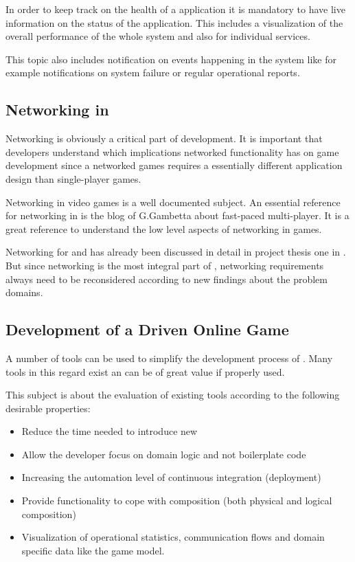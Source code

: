In order to keep track on the health of a \ms{} application it is mandatory to
have live information on the status of the application. This includes a
visualization of the overall performance of the whole system and also for
individual services.

This topic also includes notification on events happening in the system like for
example notifications on system failure or regular operational reports. 

\subsection{Networking in \ogs{}}

Networking is obviously a critical part of \og{} development. It is important
that developers understand which implications networked functionality has on
game development since a networked games requires a essentially different
application design than single-player games. 

Networking in video games is a well documented subject. An essential reference
for networking in \ogs{} is the blog of G.Gambetta\cite{gambetta_fast_paced}
about fast-paced multi-player. It is a great reference to understand the low
level aspects of networking in games.

Networking for \mss{} and \og{} has already been discussed in detail in project
thesis one in . But since networking is the
most integral part of \ogs{}, networking requirements always need to be
reconsidered according to new findings about the problem domains.


\subsection{Development of a \ms{} Driven Online Game}

A number of tools can be used to simplify the development process of \ms{}. Many
tools in this regard exist an can be of great value if properly used.

This subject is about the evaluation of existing tools according to the
following desirable properties:

\begin{itemize}
  \item Reduce the time needed to introduce new \mss{}
  \item Allow the developer focus on domain logic and not boilerplate code
  \item Increasing the automation level of continuous integration (deployment)
  \item Provide functionality to cope with \mss{} composition (both physical
  and logical composition)
  \item Visualization of operational statistics, communication flows and domain
  specific data like the game model.
\end{itemize}

